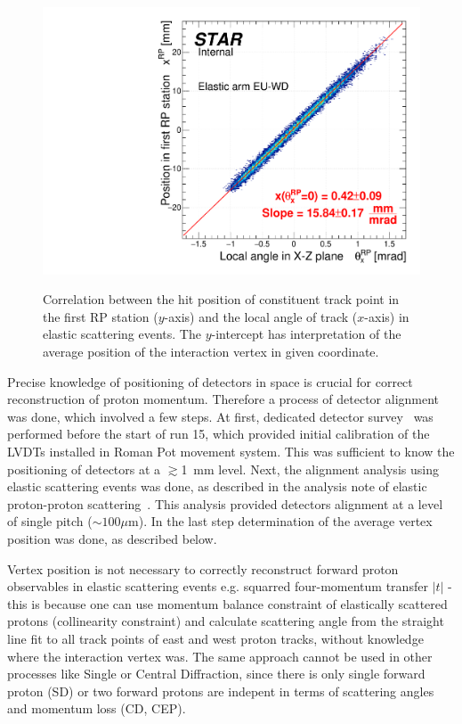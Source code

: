 \begin{figure}[b!]
{  \includegraphics[width=\linewidth,page=4]{graphics/rpSim/VxVy.pdf}
}\vspace{-5pt}%
\caption[Correlation between the hit position of constituent track point in the first RP station and the local angle of track in elastic scattering events.]%
{Correlation between the hit position of constituent track point in the first RP station ($y$-axis) and the local angle of track ($x$-axis) in elastic scattering events. The $y$-intercept has interpretation of the average position of the interaction vertex in given coordinate.}\label{fig:VxVy}%
\end{figure}


Precise knowledge of positioning of detectors in space is crucial for correct reconstruction of proton momentum. Therefore a process of detector alignment was done, which involved a few steps. At first, dedicated detector survey~\cite{surveyNote} was performed before the start of run 15, which provided initial calibration of the LVDTs installed in Roman Pot movement system. This was sufficient to know the positioning of detectors at a $\gtrsim$1~mm level. Next, the alignment analysis using elastic scattering events was done, as described in the analysis note of elastic proton-proton scattering~\cite{ElasticNote}. This analysis provided detectors alignment at a level of single pitch ($\sim 100\mu\text{m}$). In the last step determination of the average vertex position was done, as described below.

Vertex position is not necessary to correctly reconstruct forward proton observables in elastic scattering events  e.g. squarred four-momentum transfer $|t|$ - this is because one can use momentum balance constraint of elastically scattered protons (collinearity constraint) and calculate scattering angle from the straight line fit to all track points of east and west proton tracks, without knowledge where the interaction vertex was. The same approach cannot be used in other processes like Single or Central Diffraction, since there is only single forward proton (SD) or two forward protons are indepent in terms of scattering angles and momentum loss (CD, CEP).

